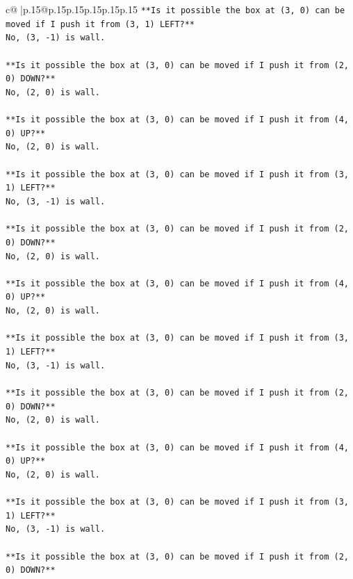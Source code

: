 \documentclass{article}
\begin{document}
{\begin{supertabular}{c@{$\;$}|p{.15\linewidth}@{}p{.15\linewidth}p{.15\linewidth}p{.15\linewidth}p{.15\linewidth}p{.15\linewidth}}
{{{\texttt{**Is it possible the box at (3, 0) can be moved if I push it from (3, 1) LEFT?**} \\
\texttt{No, (3, {-}1) is wall.} \\
\\ 
\texttt{**Is it possible the box at (3, 0) can be moved if I push it from (2, 0) DOWN?**} \\
\texttt{No, (2, 0) is wall.} \\
\\ 
\texttt{**Is it possible the box at (3, 0) can be moved if I push it from (4, 0) UP?**} \\
\texttt{No, (2, 0) is wall.} \\
\\ 
\texttt{**Is it possible the box at (3, 0) can be moved if I push it from (3, 1) LEFT?**} \\
\texttt{No, (3, {-}1) is wall.} \\
\\ 
\texttt{**Is it possible the box at (3, 0) can be moved if I push it from (2, 0) DOWN?**} \\
\texttt{No, (2, 0) is wall.} \\
\\ 
\texttt{**Is it possible the box at (3, 0) can be moved if I push it from (4, 0) UP?**} \\
\texttt{No, (2, 0) is wall.} \\
\\ 
\texttt{**Is it possible the box at (3, 0) can be moved if I push it from (3, 1) LEFT?**} \\
\texttt{No, (3, {-}1) is wall.} \\
\\ 
\texttt{**Is it possible the box at (3, 0) can be moved if I push it from (2, 0) DOWN?**} \\
\texttt{No, (2, 0) is wall.} \\
\\ 
\texttt{**Is it possible the box at (3, 0) can be moved if I push it from (4, 0) UP?**} \\
\texttt{No, (2, 0) is wall.} \\
\\ 
\texttt{**Is it possible the box at (3, 0) can be moved if I push it from (3, 1) LEFT?**} \\
\texttt{No, (3, {-}1) is wall.} \\
\\ 
\texttt{**Is it possible the box at (3, 0) can be moved if I push it from (2, 0) DOWN?**} \\
}}}
\end{supertabular}}
\end{document}
